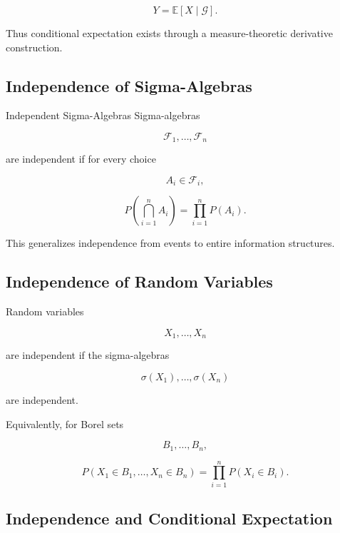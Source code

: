 \[
\boxed{
Y
=
\mathbb{E}[X\mid\mathcal{G}].
}
\]

Thus conditional expectation exists through a measure-theoretic
derivative construction.

\subsection{Independence of Sigma-Algebras}
\label{subsec:independence-sigma-algebras}

\begin{definitionbox}{Independent Sigma-Algebras}
Sigma-algebras

\[
\mathcal{F}_1,\ldots,\mathcal{F}_n
\]

are independent if for every choice

\[
A_i\in\mathcal{F}_i,
\]

\[
\boxed{
P
\left(
\bigcap_{i=1}^{n}A_i
\right)
=
\prod_{i=1}^{n}P(A_i).
}
\]
\end{definitionbox}

This generalizes independence from events to entire information
structures.

\subsection{Independence of Random Variables}
\label{subsec:rv-independence-measure}

Random variables

\[
X_1,\ldots,X_n
\]

are independent if the sigma-algebras

\[
\sigma(X_1),\ldots,\sigma(X_n)
\]

are independent.

Equivalently, for Borel sets

\[
B_1,\ldots,B_n,
\]

\[
\boxed{
P
\left(
X_1\in B_1,\ldots,X_n\in B_n
\right)
=
\prod_{i=1}^{n}
P(X_i\in B_i).
}
\]

\subsection{Independence and Conditional Expectation}
\label{subsec:independence-conditional-expectation}

